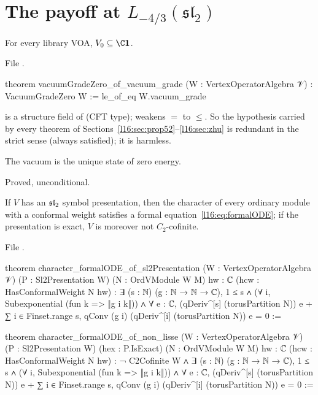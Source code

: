 \section{The payoff at $L_{-4/3}(\mathfrak{sl}_2)$}\label{l16:sec:payoff}

\begin{theorem}\label{l16:thm:vgz}
For every library VOA, $V_0\subseteq\C\lsixteenvac$.
\end{theorem}
\noindent File .
\begin{leancode}
theorem vacuumGradeZero_of_vacuum_grade (W : VertexOperatorAlgebra 𝒱) : VacuumGradeZero W :=
  le_of_eq W.vacuum_grade
\end{leancode}

\begin{dictionary}
\allowbreak{}\allowbreak{}\allowbreak{} is a structure field of  (CFT type); 
weakens $=$ to $\le$. So the hypothesis  carried by every theorem of Sections~\ref{l16:sec:prop52}--\ref{l16:sec:zhu}
is redundant in the strict sense (always satisfied); it is harmless.
\end{dictionary}

\begin{physics}
The vacuum is the unique state of zero energy.
\end{physics}

\begin{status}
Proved, unconditional.
\end{status}

\begin{theorem}\label{l16:thm:payoffGen}
If $V$ has an $\mathfrak{sl}_2$ symbol presentation, then the character of every ordinary module with a conformal weight satisfies
a formal equation~\eqref{l16:eq:formalODE}; if the presentation is exact, $V$ is moreover not $C_2$-cofinite.
\end{theorem}
\noindent File .
\begin{leancode}
theorem character_formalODE_of_sl2Presentation (W : VertexOperatorAlgebra 𝒱)
    (P : Sl2Presentation W) (N : OrdVModule W M) {hw : ℂ} (hcw : HasConformalWeight N hw) :
    ∃ (s : ℕ) (g : ℕ → ℕ → ℂ), 1 ≤ s ∧ (∀ i, Subexponential (fun k => ‖g i k‖)) ∧
      ∀ e : ℂ, (qDeriv^[s] (torusPartition N)) e
        + ∑ i ∈ Finset.range s, qConv (g i) (qDeriv^[i] (torusPartition N)) e = 0 :=

theorem character_formalODE_of_non_lisse (W : VertexOperatorAlgebra 𝒱)
    (P : Sl2Presentation W) (hex : P.IsExact)
    (N : OrdVModule W M) {hw : ℂ} (hcw : HasConformalWeight N hw) :
    ¬ C2Cofinite W ∧
      ∃ (s : ℕ) (g : ℕ → ℕ → ℂ), 1 ≤ s ∧ (∀ i, Subexponential (fun k => ‖g i k‖)) ∧
        ∀ e : ℂ, (qDeriv^[s] (torusPartition N)) e
          + ∑ i ∈ Finset.range s, qConv (g i) (qDeriv^[i] (torusPartition N)) e = 0 :=
\end{leancode}

